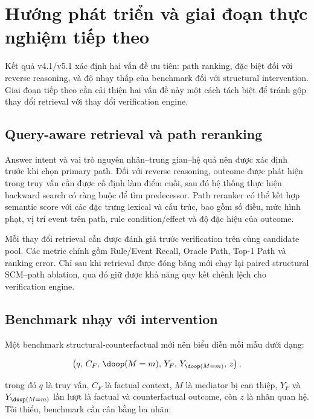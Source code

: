 \section{Hướng phát triển và giai đoạn thực nghiệm tiếp theo}
\label{sec:future}

Kết quả v4.1/v5.1 xác định hai vấn đề ưu tiên: path ranking, đặc biệt đối với
reverse reasoning, và độ nhạy thấp của benchmark đối với structural
intervention. Giai đoạn tiếp theo cần cải thiện hai vấn đề này một cách tách
biệt để tránh gộp thay đổi retrieval với thay đổi verification engine.

\subsection{Query-aware retrieval và path reranking}

Answer intent và vai trò nguyên nhân--trung gian--hệ quả nên được xác định
trước khi chọn primary path. Đối với reverse reasoning, outcome được phát
hiện trong truy vấn cần được cố định làm điểm cuối, sau đó hệ thống thực hiện
backward search có ràng buộc để tìm predecessor. Path reranker có thể kết hợp
semantic score với các đặc trưng lexical và cấu trúc, bao gồm số điều, mức
hình phạt, vị trí event trên path, rule condition/effect và độ đặc hiệu của
outcome.

Mỗi thay đổi retrieval cần được đánh giá trước verification trên cùng
candidate pool. Các metric chính gồm Rule/Event Recall, Oracle Path, Top-1
Path và ranking error. Chỉ sau khi retrieval được đóng băng mới chạy lại
paired structural SCM--path ablation, qua đó giữ được khả năng quy kết chênh
lệch cho verification engine.

\subsection{Benchmark nhạy với intervention}

Một benchmark structural-counterfactual mới nên biểu diễn mỗi mẫu dưới dạng:

\begin{equation}
\left(
q,\,
C_F,\,
\doop(M=m),\,
Y_F,\,
Y_{\doop(M=m)},\,
z
\right),
\label{eq:future-counterfactual-item}
\end{equation}

trong đó $q$ là truy vấn, $C_F$ là factual context, $M$ là mediator bị can
thiệp, $Y_F$ và $Y_{\doop(M=m)}$ lần lượt là factual và counterfactual
outcome, còn $z$ là nhãn quan hệ. Tối thiểu, benchmark cần cân bằng ba nhãn:

